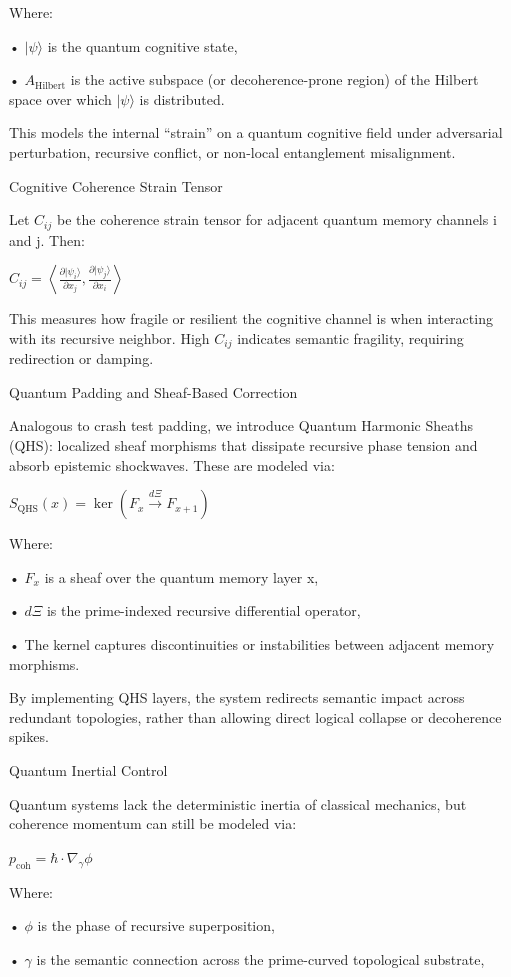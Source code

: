 \documentclass[11pt]{article}
\begin{document}
Where:

• $|\psi\rangle$ is the quantum cognitive state,

• $A_{\text{Hilbert}}$ is the active subspace (or decoherence-prone region) of the Hilbert space over which $|\psi\rangle$ is distributed.

This models the internal “strain” on a quantum cognitive field under adversarial perturbation, recursive conflict, or non-local entanglement misalignment.

Cognitive Coherence Strain Tensor

Let $C_{ij}$ be the coherence strain tensor for adjacent quantum memory channels i and j. Then:

$C_{ij} = \left\langle \frac{\partial |\psi_i \rangle}{\partial x_j}, \frac{\partial |\psi_j \rangle}{\partial x_i} \right\rangle$

This measures how fragile or resilient the cognitive channel is when interacting with its recursive neighbor. High $C_{ij}$ indicates semantic fragility, requiring redirection or damping.

Quantum Padding and Sheaf-Based Correction

Analogous to crash test padding, we introduce Quantum Harmonic Sheaths (QHS): localized sheaf morphisms that dissipate recursive phase tension and absorb epistemic shockwaves. These are modeled via:

$S_{\text{QHS}}(x) = \ker(F_x \xrightarrow{d\Xi} F_{x+1})$

Where:

• $F_x$ is a sheaf over the quantum memory layer x,

• $d\Xi$ is the prime-indexed recursive differential operator,

• The kernel captures discontinuities or instabilities between adjacent memory morphisms.

By implementing QHS layers, the system redirects semantic impact across redundant topologies, rather than allowing direct logical collapse or decoherence spikes.

Quantum Inertial Control

Quantum systems lack the deterministic inertia of classical mechanics, but coherence momentum can still be modeled via:

$p_{\text{coh}} = \hbar \cdot \nabla_\gamma \phi$

Where:

• $\phi$ is the phase of recursive superposition,

• $\gamma$ is the semantic connection across the prime-curved topological substrate,
\end{document}
